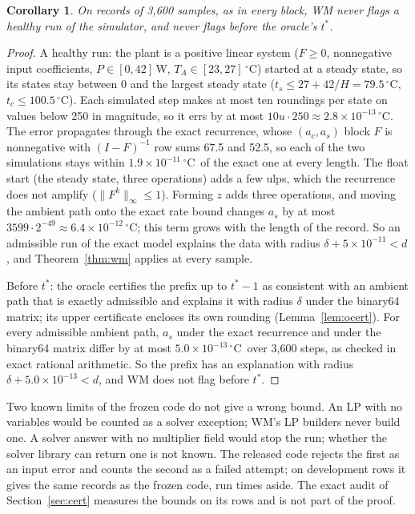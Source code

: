 \documentclass[11pt,a4paper]{article}
\newtheorem{acorollary}[alemma]{Corollary}
\newcommand{\degC}{\ensuremath{{}^\circ}C}
\newcommand{\sci}[2]{\ensuremath{#1\times10^{#2}}}
\newcommand{\tstar}{t^{\ast}}
\begin{document}
\begin{acorollary}\label{cor:wm}
On records of 3,600 samples, as in every block, WM never flags a healthy run of the simulator, and never flags before
the oracle's $\tstar$.
\end{acorollary}
\begin{proof}
A healthy run: the plant is a positive linear system ($F\ge0$, nonnegative input coefficients, $P\in[0,42]$\,W,
$T_A\in[23,27]$\,\degC) started at a steady state, so its states stay between 0 and the largest steady state
($t_s\le 27+42/H = 79.5$\,\degC, $t_c\le 100.5$\,\degC). Each simulated step makes at most ten roundings per state on
values below 250 in magnitude, so it errs
by at most $10u\cdot250\approx\sci{2.8}{-13}$\,\degC. The error propagates through the exact recurrence, whose
$(a_c, a_s)$ block $F$ is nonnegative with $(I-F)^{-1}$ row sums 67.5 and 52.5, so each of the two simulations stays
within \sci{1.9}{-11}\,\degC\ of the exact one at every length. The float start (the steady state, three operations)
adds a few ulps, which the recurrence does not amplify ($\|F^k\|_\infty\le1$). Forming $z$ adds three operations, and moving the ambient
path onto the exact rate bound changes $a_s$ by at most $3599\cdot2^{-49}\approx\sci{6.4}{-12}$\,\degC; this term grows
with the length of the record. So an admissible run of the exact model
explains the data with radius $\delta + \sci{5}{-11} < d$, and Theorem~\ref{thm:wm} applies at every sample.

Before $\tstar$: the oracle certifies the prefix up to $\tstar-1$ as consistent with an ambient path that is exactly
admissible and explains it with radius $\delta$ under the binary64 matrix; its upper certificate encloses its own
rounding (Lemma~\ref{lem:ocert}). For every admissible ambient path, $a_s$ under the exact recurrence and under the binary64 matrix differ by
at most \sci{5.0}{-13}\,\degC\ over 3,600 steps, as checked in exact rational arithmetic. So the prefix has an
explanation with radius $\delta + \sci{5.0}{-13} < d$, and WM does not flag before $\tstar$.
\end{proof}

Two known limits of the frozen code do not give a wrong bound. An LP with no variables would be counted as a solver
exception; WM's LP builders never build one. A solver answer with no multiplier field would stop the run; whether the
solver library can return one is not known. The released code rejects the first as an input error and counts the
second as a failed attempt; on development rows it gives the same records as the frozen code, run times aside. The exact audit of Section~\ref{sec:cert} measures the bounds on its rows
and is not part of the proof.



\end{document}
